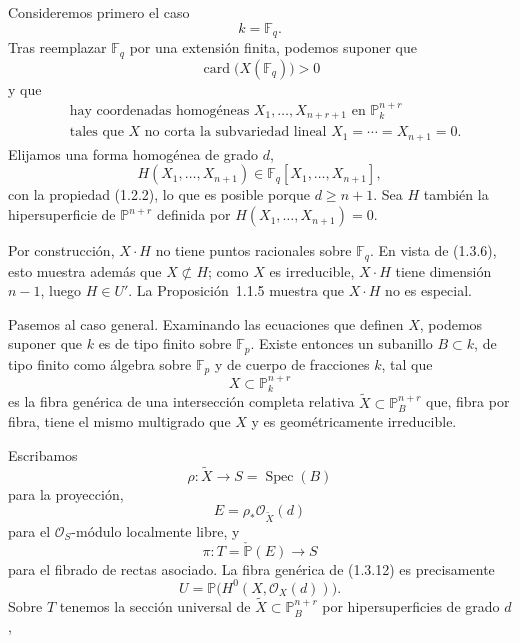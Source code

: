 Consideremos primero el caso
\begin{equation}\tag{1.3.5}
k=\mathbb F_q.
\end{equation}
Tras reemplazar $\mathbb F_q$ por una extensión finita, podemos suponer
que
\begin{equation}\tag{1.3.6}
\operatorname{card}\bigl(X(\mathbb F_q)\bigr)>0
\end{equation}
y que
\begin{equation}\tag{1.3.7}
\begin{aligned}
&\text{hay coordenadas homogéneas }X_1,\dots,X_{n+r+1}
 \text{ en }\mathbb P_k^{n+r}\\
&\text{tales que $X$ no corta la subvariedad lineal }
X_1=\cdots=X_{n+1}=0.
\end{aligned}
\end{equation}
Elijamos una forma homogénea de grado $d$,
\begin{equation}\tag{1.3.8}
H(X_1,\dots,X_{n+1})\in
\mathbb F_q[X_1,\dots,X_{n+1}],
\end{equation}
con la propiedad (1.2.2), lo que es posible porque $d\geq n+1$. Sea $H$
también la hipersuperficie de $\mathbb P^{n+r}$ definida por
$H(X_1,\dots,X_{n+1})=0$.

\pageoriginale

Por construcción, $X\mathbin{\cdot}H$ no tiene puntos racionales sobre
$\mathbb F_q$. En vista de (1.3.6), esto muestra además que
$X\not\subset H$; como $X$ es irreducible,
$X\mathbin{\cdot}H$ tiene dimensión $n-1$, luego $H\in U'$. La
Proposición~1.1.5 muestra que $X\mathbin{\cdot}H$ no es especial.

Pasemos al caso general. Examinando las ecuaciones que definen $X$,
podemos suponer que $k$ es de tipo finito sobre $\mathbb F_p$. Existe
entonces un subanillo $B\subset k$, de tipo finito como álgebra sobre
$\mathbb F_p$ y de cuerpo de fracciones $k$, tal que
\begin{equation}\tag{1.3.9}
X\subset\mathbb P_k^{n+r}
\end{equation}
es la fibra genérica de una intersección completa relativa
$\widetilde X\subset\mathbb P_B^{n+r}$ que, fibra por fibra, tiene el
mismo multigrado que $X$ y es geométricamente irreducible.

Escribamos
\begin{equation}\tag{1.3.10}
\rho:\widetilde X\longrightarrow S=\operatorname{Spec}(B)
\end{equation}
para la proyección,
\begin{equation}\tag{1.3.11}
E=\rho_*\mathcal O_{\widetilde X}(d)
\end{equation}
para el $\mathcal O_S$-módulo localmente libre, y
\begin{equation}\tag{1.3.12}
\pi:T=\check{\mathbb P}(E)\longrightarrow S
\end{equation}
para el fibrado de rectas asociado. La fibra genérica de (1.3.12) es
precisamente
\[
U=\mathbb P\bigl(H^0(X,\mathcal O_X(d))\bigr).
\]
Sobre $T$ tenemos la sección universal de
$\widetilde X\subset\mathbb P_B^{n+r}$ por hipersuperficies de grado $d$,


